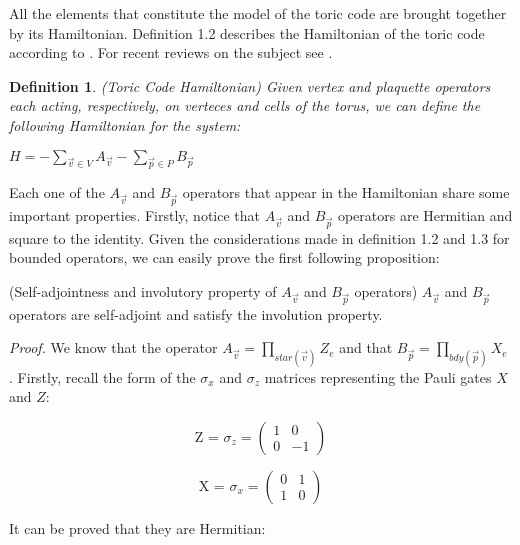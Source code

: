 \documentclass{Configuration_Files/PoliMi3i_thesis}
\newtheorem{definition}{Definition}[chapter]
\begin{document}
All the elements that constitute the model of the toric code are brought together by its Hamiltonian. Definition 1.2 describes the Hamiltonian of the toric code 
{according to \cite{Kit02}}. For recent reviews on the subject see \cite{Her20}.

\begin{definition} (Toric Code Hamiltonian) Given vertex and plaquette operators each acting, respectively, on verteces and cells of the torus, we can define the following Hamiltonian for the system:
\end{definition}

\begin{center}
	
	$H = -\sum_{\vec{v} \in V}
	A_{\vec{v}} - \sum_{\vec{p} \in P} B_{\vec{p}} $
	
\end{center}

Each one of the $A_{\vec{v}}$ and $B_{\vec{p}}$ operators that appear in the Hamiltonian share some important properties. Firstly, notice that $A_{\vec{v}}$ and $B_{\vec{p}}$ operators are Hermitian and square to the identity. Given the considerations made in definition 1.2 and 1.3 for bounded operators, we can easily prove the first following proposition:

\begin{proposition} (Self-adjointness and involutory property of $A_{\vec{v}}$ and $B_{\vec{p}}$ operators)
$A_{\vec{v}}$ and $B_{\vec{p}}$ operators are self-adjoint and satisfy the involution property.
\end{proposition}
	
\textit{Proof.}
We know that the operator $A_{\vec{v}} = \prod_{star(\vec{v})} Z_e$ and that $ B_{\vec{p}} = \prod_{bdy(\vec{p})} X_e  $ .\newline
Firstly, recall the form of the $\sigma_x$ and $\sigma_z$ matrices representing the Pauli gates $X$ and $Z$:



\[
\text{Z = $\sigma_z$} =
\begin{pmatrix}
	1 & 0 \\
	0 & -1
\end{pmatrix}
\]


\[
\text{X = $\sigma_x$} =
\begin{pmatrix}
	0 & 1 \\
	1 & 0
\end{pmatrix}
\]


It can be proved that they are Hermitian:\newline
\end{document}
